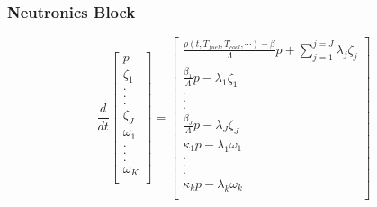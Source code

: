 \begin{frame}[fragile]
  \frametitle{Neutronics Block}
  \footnotesize{
\begin{equation} 
  \frac{d}{dt}\left[
    \begin{array}{c}
      p\\
      \zeta_1\\
      .\\
      .\\
      .\\
      \zeta_J\\
      \omega_1\\
      .\\
      .\\
      .\\
      \omega_K\\
    \end{array}
    \right]
    =
    \left[
      \begin{array}{ c }
        \frac{\rho(t,T_{fuel},T_{cool},\cdots)-\beta}{\Lambda}p + 
        \displaystyle\sum^{j=J}_{j=1}\lambda_j\zeta_j\\
        \frac{\beta_1}{\Lambda} p - \lambda_1\zeta_1\\
        .\\
        .\\
        .\\
        \frac{\beta_J}{\Lambda}p-\lambda_J\zeta_J\\
        \kappa_1p - \lambda_1\omega_1\\
        .\\
        .\\
        .\\
        \kappa_{k}p - \lambda_k\omega_{k}\\
      \end{array}
      \right]
      \label{eqn:neutronics_prke}
    \end{equation}
  
  }
\end{frame}

